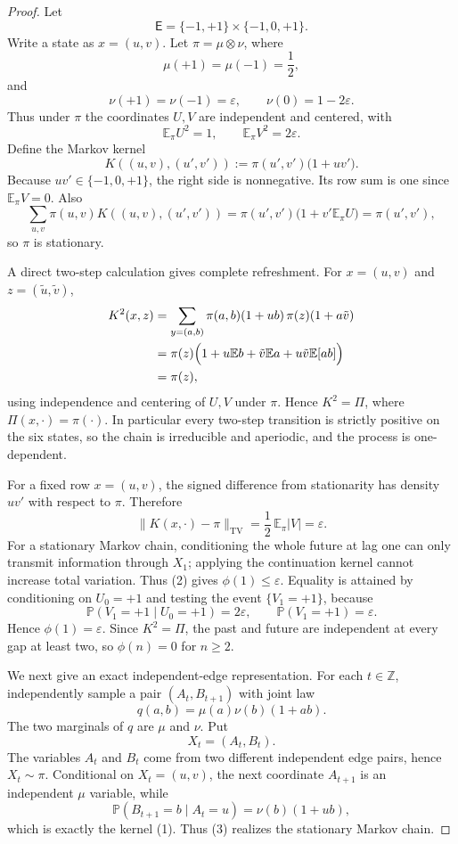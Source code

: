 \begin{proof}
Let
\[
  \mathsf E=\{-1,+1\}\times\{-1,0,+1\}.
\]
Write a state as $x=(u,v)$.  Let $\pi=\mu\otimes\nu$, where
\[
  \mu(+1)=\mu(-1)=\frac12,
\]
and
\[
  \nu(+1)=\nu(-1)=\varepsilon,
  \qquad \nu(0)=1-2\varepsilon.
\]
Thus under $\pi$ the coordinates $U,V$ are independent and centered, with
\[
  \mathbb E_\pi U^2=1,\qquad
  \mathbb E_\pi V^2=2\varepsilon.
\]
Define the Markov kernel
\[
  K((u,v),(u',v')):=\pi(u',v')\bigl(1+uv'\bigr).
  \tag{1}
\]
Because $uv'\in\{-1,0,+1\}$, the right side is nonnegative.  Its row sum is
one since $\mathbb E_\pi V=0$.  Also
\[
\sum_{u,v}\pi(u,v)K((u,v),(u',v'))
 =\pi(u',v')\bigl(1+v'\mathbb E_\pi U\bigr)
 =\pi(u',v'),
\]
so $\pi$ is stationary.

A direct two-step calculation gives complete refreshment.  For
$x=(u,v)$ and $z=(\tilde u,\tilde v)$,
\begin{align*}
 K^2(x,z)
 &=\sum_{y=(a,b)} \pi(a,b)(1+ub)\,\pi(z)(1+a\tilde v)\\
 &=\pi(z)\Bigl(1+u\mathbb E b+\tilde v\mathbb E a
      +u\tilde v\mathbb E[ab]\Bigr)\\
 &=\pi(z),
\end{align*}
using independence and centering of $U,V$ under $\pi$.  Hence $K^2=\Pi$,
where $\Pi(x,\cdot)=\pi(\cdot)$.  In particular every two-step transition
is strictly positive on the six states, so the chain is irreducible and
aperiodic, and the process is one-dependent.

For a fixed row $x=(u,v)$, the signed difference from stationarity has
density $uv'$ with respect to $\pi$.  Therefore
\[
 \|K(x,\cdot)-\pi\|_{\mathrm{TV}}
 =\frac12\,\mathbb E_\pi |V|
 =\varepsilon.
 \tag{2}
\]
For a stationary Markov chain, conditioning the whole future at lag one can
only transmit information through $X_1$; applying the continuation kernel
cannot increase total variation.  Thus (2) gives $\phi(1)\le\varepsilon$.
Equality is attained by conditioning on $U_0=+1$ and testing the event
$\{V_1=+1\}$, because
\[
 \mathbb P(V_1=+1\mid U_0=+1)=2\varepsilon,
 \qquad
 \mathbb P(V_1=+1)=\varepsilon.
\]
Hence $\phi(1)=\varepsilon$.  Since $K^2=\Pi$, the past and future are
independent at every gap at least two, so $\phi(n)=0$ for $n\ge2$.

We next give an exact independent-edge representation.  For each
$t\in\mathbb Z$, independently sample a pair $(A_t,B_{t+1})$ with joint law
\[
 q(a,b)=\mu(a)\nu(b)(1+ab).
 \tag{3}
\]
The two marginals of $q$ are $\mu$ and $\nu$.  Put
\[
 X_t=(A_t,B_t).
\]
The variables $A_t$ and $B_t$ come from two different independent edge
pairs, hence $X_t\sim\pi$.  Conditional on $X_t=(u,v)$, the next coordinate
$A_{t+1}$ is an independent $\mu$ variable, while
\[
 \mathbb P(B_{t+1}=b\mid A_t=u)=\nu(b)(1+ub),
\]
which is exactly the kernel (1).  Thus (3) realizes the stationary Markov
chain.


\end{proof}
